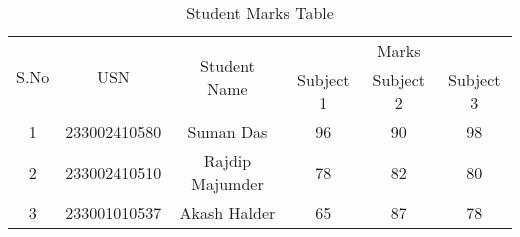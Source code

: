 \documentclass{article}
\begin{document}
\begin{table}[h!]
\centering
\begin{tabular}{|c|c|c|c|c|c|}
\hline
\multirow{2}{*}{S.No} & \multirow{2}{*}{USN} & \multirow{2}{*}{Student Name} & \multicolumn{3}{c|}{Marks} \\ \cline{4-6} 
                      &                      &                               & Subject 1 & Subject 2 & Subject 3 \\ \hline
1                     & 233002410580                & Suman Das            & 96        & 90        & 98        \\ \hline
2                     & 233002410510                & Rajdip Majumder                    & 78        & 82        & 80        \\ \hline
3                     & 233001010537                & Akash Halder                 & 65        & 87        & 78        \\ \hline
\end{tabular}
\caption{Student Marks Table}
\label{tab:student_marks}
\end{table}
\end{document}
